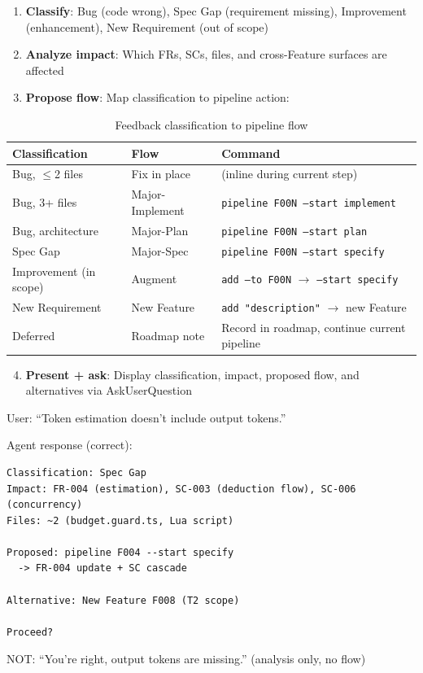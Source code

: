 \documentclass[11pt,a4paper,openright,twoside]{report}
\begin{document}
\begin{enumerate}[nosep]
  \item \textbf{Classify}: Bug (code wrong), Spec Gap (requirement missing), Improvement (enhancement), New Requirement (out of scope)
  \item \textbf{Analyze impact}: Which FRs, SCs, files, and cross-Feature surfaces are affected
  \item \textbf{Propose flow}: Map classification to pipeline action:
\end{enumerate}

\begin{table}[H]
\centering
\caption{Feedback classification to pipeline flow}
\begin{tabularx}{\textwidth}{llX}
\toprule
\textbf{Classification} & \textbf{Flow} & \textbf{Command} \\
\midrule
Bug, $\leq$2 files & Fix in place & (inline during current step) \\
Bug, 3+ files & Major-Implement & \texttt{pipeline F00N --start implement} \\
Bug, architecture & Major-Plan & \texttt{pipeline F00N --start plan} \\
Spec Gap & Major-Spec & \texttt{pipeline F00N --start specify} \\
Improvement (in scope) & Augment & \texttt{add --to F00N} $\rightarrow$ \texttt{--start specify} \\
New Requirement & New Feature & \texttt{add "description"} $\rightarrow$ new Feature \\
Deferred & Roadmap note & Record in roadmap, continue current pipeline \\
\bottomrule
\end{tabularx}
\end{table}

\begin{enumerate}[nosep]
  \setcounter{enumi}{3}
  \item \textbf{Present + ask}: Display classification, impact, proposed flow, and alternatives via AskUserQuestion
\end{enumerate}

\begin{tipbox}
User: ``Token estimation doesn't include output tokens.''

Agent response (correct):
\begin{lstlisting}
Classification: Spec Gap
Impact: FR-004 (estimation), SC-003 (deduction flow), SC-006 (concurrency)
Files: ~2 (budget.guard.ts, Lua script)

Proposed: pipeline F004 --start specify
  -> FR-004 update + SC cascade

Alternative: New Feature F008 (T2 scope)

Proceed?
\end{lstlisting}

NOT: ``You're right, output tokens are missing.'' (analysis only, no flow)
\end{tipbox}
\end{document}
